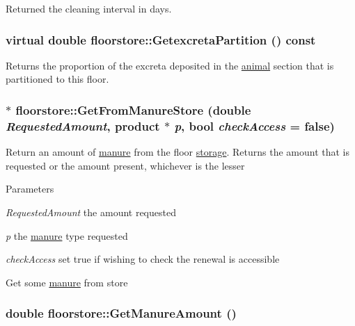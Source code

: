 Returned the cleaning interval in days. \hypertarget{classfloorstore_ac5c125d05321b8e7e26111d51f17f30c}{
\subsubsection[{GetexcretaPartition}]{\setlength{\rightskip}{0pt plus 5cm}virtual double floorstore::GetexcretaPartition () const}}
\label{classfloorstore_ac5c125d05321b8e7e26111d51f17f30c}


Returns the proportion of the excreta deposited in the \hyperlink{classanimal}{animal} section that is partitioned to this floor. \hypertarget{classfloorstore_a24e0d595a9a68e3a7cc2c6bf8ee1bee1}{
\subsubsection[{GetFromManureStore}]{ $\ast$ floorstore::GetFromManureStore (double {\em RequestedAmount}, \/  {\bf product} $\ast$ {\em p}, \/  bool {\em checkAccess} = {\ttfamily false})}}
\label{classfloorstore_a24e0d595a9a68e3a7cc2c6bf8ee1bee1}


Return an amount of \hyperlink{classmanure}{manure} from the floor \hyperlink{classstorage}{storage}. Returns the amount that is requested or the amount present, whichever is the lesser 
\begin{DoxyParams}{Parameters}
\item[{\em RequestedAmount}]the amount requested \item[{\em p}]the \hyperlink{classmanure}{manure} type requested \item[{\em checkAccess}]set true if wishing to check the renewal is accessible\end{DoxyParams}
Get some \hyperlink{classmanure}{manure} from store \hypertarget{classfloorstore_aead39ccc3f6e82ecc1f62d1b570c312a}{
\subsubsection[{GetManureAmount}]{\setlength{\rightskip}{0pt plus 5cm}double floorstore::GetManureAmount ()}}
\label{classfloorstore_aead39ccc3f6e82ecc1f62d1b570c312a}


